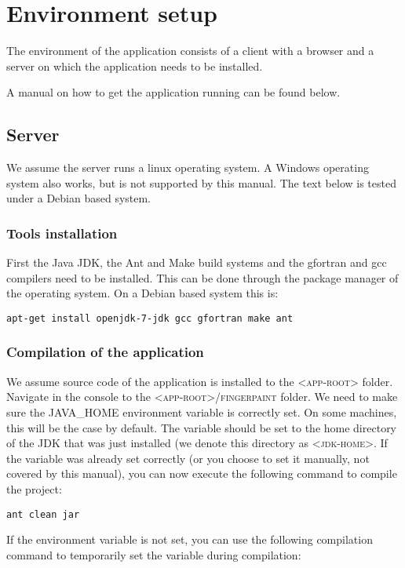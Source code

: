 \chapter{Environment setup}
\label{environment_setup}
The environment of the \applicationname{} application consists of a client with a browser and a server on which the application needs to be installed.

A manual on how to get the \applicationname{} application running can be found below.

\section{Server}
We assume the server runs a linux operating system. A Windows operating system also works, but is not supported by this manual. The text below is tested under a Debian based system.

\subsection{Tools installation}
First the Java JDK, the Ant and Make build systems and the gfortran and gcc compilers need to be installed. This can be done through the package manager of the operating system. On a Debian based system this is:

\begin{verbatim}
apt-get install openjdk-7-jdk gcc gfortran make ant
\end{verbatim}

\subsection{Compilation of the application}
We assume source code of the application is installed to the \textsc{<app-root>} folder.
Navigate in the console to the \textsc{<app-root>/fingerpaint} folder. 
We need to make sure the \textsc{JAVA\_HOME} environment variable is correctly set. On some machines, this will be the case by default. The variable should be set to the home directory of the JDK that was just installed (we denote this directory as \textsc{<jdk-home>}. If the variable was already set correctly (or you choose to set it manually, not covered by this manual), you can now execute the following command to compile the project:

\begin{verbatim}
ant clean jar
\end{verbatim}

If the environment variable is not set, you can use the following compilation command to temporarily set the variable during compilation:

